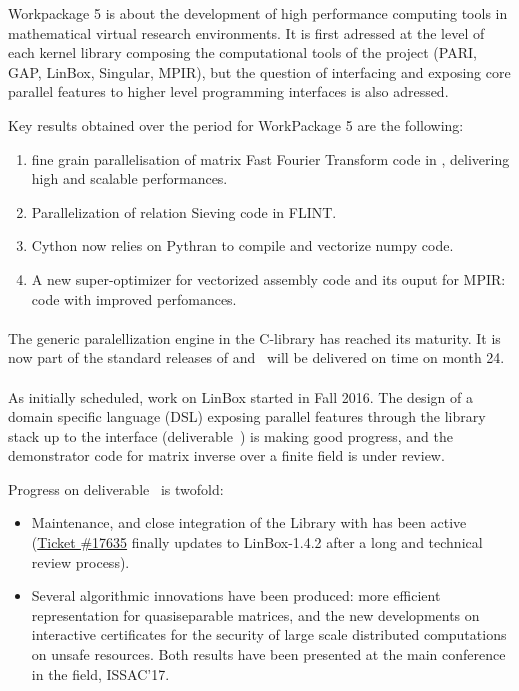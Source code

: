 \documentclass{deliverablereport}
\begin{document}
  Workpackage 5 is about the development of high performance computing tools in
  mathematical virtual research environments. It is first adressed at the level
  of each kernel library composing the computational tools of the project (PARI,
  GAP, LinBox, Singular, MPIR), but the question of interfacing and exposing
  core parallel features to higher level programming interfaces is also
  adressed.
  

  Key results obtained over the period for WorkPackage 5 are the following:
  \begin{enumerate}
  \item fine grain parallelisation of matrix Fast Fourier Transform code in
    \FLINT, delivering high and scalable performances.
  \item Parallelization of  relation  Sieving code in FLINT.
  \item Cython now relies on Pythran to compile and vectorize numpy code.
  \item A new super-optimizer for vectorized assembly code and its ouput for MPIR: code with improved perfomances.
  \end{enumerate}

\paragraph{}
The generic paralellization engine in the \Pari C-library
has reached its maturity. It is now part of the standard releases of \Pari
and~
will be delivered on time on month 24.

\paragraph{}

\paragraph{}


As initially scheduled, work on LinBox started in Fall 2016. The design of
a domain specific language (DSL) exposing parallel features through the library
stack up to the \Sage interface (deliverable~) is
making good progress, and the demonstrator code for matrix inverse over a finite field is under review.

Progress on deliverable~ is twofold:
\begin{itemize}
\item Maintenance, and close integration of the Library with \Sage has been
active (\href{https://trac.sagemath.org/ticket/17635}{Ticket \#17635} finally
updates \Sage to LinBox-1.4.2 after a long and technical review process).
\item Several algorithmic innovations have been produced: more efficient
  representation for quasiseparable matrices, and the new developments on
  interactive certificates for the security of large scale distributed
  computations on unsafe resources. Both results have been presented at the
  main conference in the field, ISSAC'17.
\end{itemize}
\end{document}

